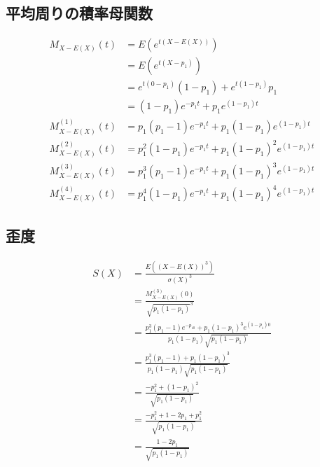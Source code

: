 \documentclass[dvipdfmx]{jsarticle}
\begin{document}
 \subsection{平均周りの積率母関数}
 \begin{align}
  M_{X-E\left(X\right)}\left(t\right)&=E\left(e^{t\left(X-E\left(X\right)\right)}\right)\nonumber\\
  &=E\left(e^{t\left(X-p_1\right)}\right)\nonumber\\
  &=e^{t\left(0-p_1\right)}\left(1-p_1\right)+e^{t\left(1-p_1\right)}p_1\nonumber\\
  &=\left(1-p_1\right)e^{-p_1t}+p_1e^{\left(1-p_1\right)t}\nonumber\\
  M_{X-E\left(X\right)}^{\left(1\right)}\left(t\right)&=p_1\left(p_1-1\right)e^{-p_1t}+p_1\left(1-p_1\right)e^{\left(1-p_1\right)t}\\
  M_{X-E\left(X\right)}^{\left(2\right)}\left(t\right)&=p_1^2\left(1-p_1\right)e^{-p_1t}+p_1\left(1-p_1\right)^2e^{\left(1-p_1\right)t}\\
  M_{X-E\left(X\right)}^{\left(3\right)}\left(t\right)&=p_1^3\left(p_1-1\right)e^{-p_1t}+p_1\left(1-p_1\right)^3e^{\left(1-p_1\right)t}\\
  M_{X-E\left(X\right)}^{\left(4\right)}\left(t\right)&=p_1^4\left(1-p_1\right)e^{-p_1t}+p_1\left(1-p_1\right)^4e^{\left(1-p_1\right)t}
 \end{align}
 \subsection{歪度}
 \begin{align}
  S\left(X\right)&=\frac{E\left(\left(X-E\left(X\right)\right)^3\right)}{\sigma\left(X\right)^3}\nonumber\\
  &=\frac{M_{X-E\left(X\right)}^{\left(3\right)}\left(0\right)}{\sqrt{p_1\left(1-p_1\right)}^3}\nonumber\\
  &=\frac{p_1^3\left(p_1-1\right)e^{-p_10}+p_1\left(1-p_1\right)^3e^{\left(1-p_1\right)0}}{p_1\left(1-p_1\right)\sqrt{p_1\left(1-p_1\right)}}\nonumber\\
  &=\frac{p_1^3\left(p_1-1\right)+p_1\left(1-p_1\right)^3}{p_1\left(1-p_1\right)\sqrt{p_1\left(1-p_1\right)}}\nonumber\\
  &=\frac{-p_1^2+\left(1-p_1\right)^2}{\sqrt{p_1\left(1-p_1\right)}}\nonumber\\
  &=\frac{-p_1^2+1-2p_1+p_1^2}{\sqrt{p_1\left(1-p_1\right)}}\nonumber\\
  &=\frac{1-2p_1}{\sqrt{p_1\left(1-p_1\right)}}
 \end{align}
\end{document}
